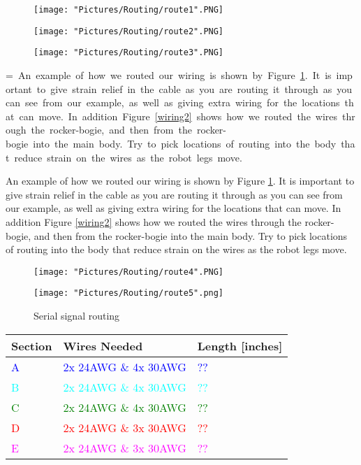 \documentclass[12pt]{article}
\makeatletter
\newcommand{\mybox}[1]{%
  \setbox0=\hbox{#1}%
  \setlength{\@tempdima}{\dimexpr\wd0+13pt}%
  \begin{tcolorbox}[colframe=mycolor,boxrule=0.5pt,arc=4pt,
      left=6pt,right=6pt,top=6pt,bottom=6pt,boxsep=0pt,width=0.95\textwidth]
    #1
  \end{tcolorbox}
}
\makeatother
\begin{document}

\begin{figure}[H]
  	\centering
  	\begin{minipage}[b]{0.34\textwidth}
    		\texttt{[image: "Pictures/Routing/route1".PNG]}
  	\end{minipage}
  	\hfill
  	\begin{minipage}[b]{0.29\textwidth}
    		\texttt{[image: "Pictures/Routing/route2".PNG]}
  	\end{minipage}
    	\hfill
  	\begin{minipage}[b]{0.30\textwidth}
    		\texttt{[image: "Pictures/Routing/route3".PNG]}
  	\end{minipage}
  	\caption{}
	\label{wiring1}
\end{figure}


\mybox{
An example of how we routed our wiring is shown by Figure \ref{wiring1}. It is important to give strain relief in the cable as you are routing it through as you can see from our example, as well as giving extra wiring for the locations that can move. In addition Figure \ref{wiring2} shows how we routed the wires through the rocker-bogie, and then from the rocker-bogie into the main body. Try to pick locations of routing into the body that reduce strain on the wires as the robot legs move.
}

\begin{figure}[H]
 	\centering
  	\begin{minipage}[b]{0.48\textwidth}
		\texttt{[image: "Pictures/Routing/route4".PNG]}
  	\end{minipage}
  	\hfill
  	\begin{minipage}[b]{0.42\textwidth}
    		\texttt{[image: "Pictures/Routing/route5".png]}
  	\end{minipage}
	\caption{Serial signal routing}
	\label{ss2rc2}
\end{figure}




\begin{tabular}[3] {| p{2cm} | p{7cm} | p{4cm} |}
	\hline
	\textbf{Section} & \textbf{Wires Needed} & \textbf{Length [inches]}  \\ \hline
	\textcolor{blue}{A} & \textcolor{blue}{2x 24AWG \& 4x 30AWG} & \textcolor{blue}{??} \\ \hline
	\textcolor{cyan}{B} & \textcolor{cyan}{2x 24AWG \& 4x 30AWG} & \textcolor{cyan}{??} \\ \hline
	\textcolor{green}{C} & \textcolor{green}{2x 24AWG \& 4x 30AWG} & \textcolor{green}{??} \\ \hline
	\textcolor{red}{D} & \textcolor{red}{2x 24AWG \& 3x 30AWG} & \textcolor{red}{??} \\ \hline
	\textcolor{magenta}{E} & \textcolor{magenta}{2x 24AWG \& 3x 30AWG} & \textcolor{magenta}{??} \\ \hline
\end{tabular}
\end{document}
